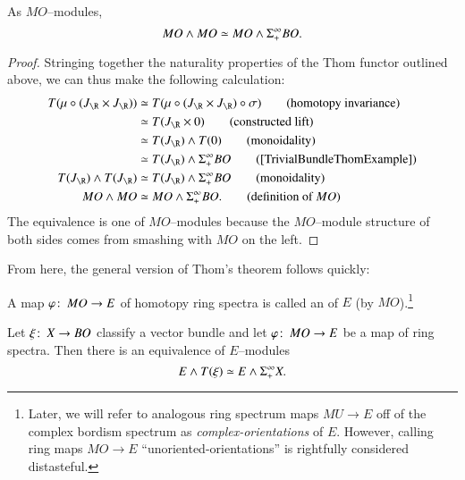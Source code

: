 \begin{lemma}
As $MO$--modules, \[MO \wedge MO \simeq MO \wedge \Sigma^\infty_+ BO.\]
\end{lemma}
\begin{proof}
Stringing together the naturality properties of the Thom functor outlined above, we can thus make the following calculation:
\begin{align*}
T(\mu \circ (J_{\R} \times J_{\R})) & \simeq T(\mu \circ (J_{\R} \times J_{\R}) \circ \sigma) \tag{homotopy invariance} \\
& \simeq T(J_{\R} \times 0) \tag{constructed lift} \\
& \simeq T(J_{\R}) \sm T(0) \tag{monoidality} \\
& \simeq T(J_{\R}) \sm \Susp^\infty_+ BO \tag{\Cref{TrivialBundleThomExample}} \\
T(J_{\R}) \sm T(J_{\R}) & \simeq T(J_{\R}) \sm \Susp^\infty_+ BO \tag{monoidality} \\
MO \sm MO & \simeq MO \sm \Susp^\infty_+ BO. \tag{definition of $MO$}
\end{align*}
The equivalence is one of $MO$--modules because the $MO$--module structure of both sides comes from smashing with $MO$ on the left.
\end{proof}

\noindent From here, the general version of Thom's theorem follows quickly:

\begin{definition}
A map $\varphi\colon\thinspace MO \to E$ of homotopy ring spectra is called an  of $E$ (by $MO$).\footnote{Later, we will refer to analogous ring spectrum maps $MU \to E$ off of the complex bordism spectrum as \textit{complex-orientations} of $E$.  However, calling ring maps $MO \to E$ ``unoriented-orientations'' is rightfully considered distasteful.}
\end{definition}

\begin{theorem}\label{GeneralThomIsom}
Let $\xi\colon\thinspace X \to BO$ classify a vector bundle and let $\varphi\colon\thinspace MO \to E$ be a map of ring spectra. Then there is an equivalence of $E$--modules \[E \wedge T(\xi) \simeq E \wedge \Sigma^\infty_+ X.\]
\end{theorem}

